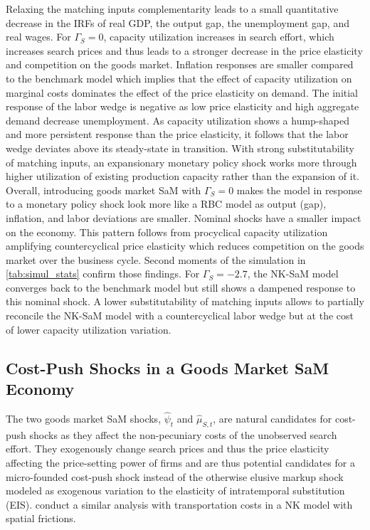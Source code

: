 \documentclass[12pt,3p,authoryear,review]{elsarticle}
\begin{document}
Relaxing the matching inputs complementarity leads to a small quantitative decrease in the IRFs of real GDP, the output gap, the unemployment gap, and real wages. For $\Gamma_S = 0$, capacity utilization increases in search effort, which increases search prices and thus leads to a stronger decrease in the price elasticity and competition on the goods market. Inflation responses are smaller compared to the benchmark model which implies that the effect of capacity utilization on marginal costs dominates the effect of the price elasticity on demand. The initial response of the labor wedge is negative as low price elasticity and high aggregate demand decrease unemployment. As capacity utilization shows a hump-shaped and more persistent response than the price elasticity, it follows that the labor wedge deviates above its steady-state in transition. With strong substitutability of matching inputs, an expansionary monetary policy shock works more through higher utilization of existing production capacity rather than the expansion of it.\\%
Overall, introducing goods market SaM with $\Gamma_S = 0$ makes the model in response to a monetary policy shock look more like a RBC model as output (gap), inflation, and labor deviations are smaller. Nominal shocks have a smaller impact on the economy. This pattern follows from procyclical capacity utilization amplifying countercyclical price elasticity which reduces competition on the goods market over the business cycle. Second moments of the simulation in \cref{tab:simul_stats} confirm those findings. For $\Gamma_S = -2.7$, the NK-SaM model converges back to the benchmark model but still shows a dampened response to this nominal shock. A lower substitutability of matching inputs allows to partially reconcile the NK-SaM model with a countercyclical labor wedge but at the cost of lower capacity utilization variation.%
\subsection{Cost-Push Shocks in a Goods Market SaM Economy}%
The two goods market SaM shocks, $\hat{\psi}_t$ and $\hat{\mu}_{S,t}$, are natural candidates for cost-push shocks as they affect the non-pecuniary costs of the unobserved search effort. They exogenously change search prices and thus the price elasticity affecting the price-setting power of firms and are thus potential candidates for a micro-founded cost-push shock instead of the otherwise elusive markup shock modeled as exogenous variation to the elasticity of intratemporal substitution (EIS). \cite{schmitt2025hotelling} conduct a similar analysis with transportation costs in a NK model with spatial frictions.%
\end{document}
